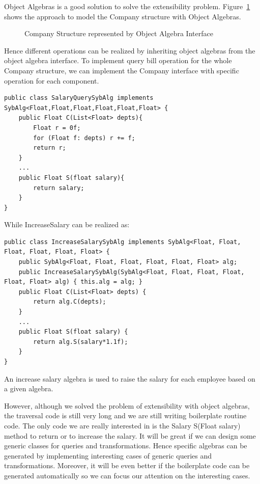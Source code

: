 Object Algebras is a good solution to solve the extensibility
problem.  
Figure~\ref{syb_tree} shows the approach to model the Company
structure with Object Algebras.

\begin{figure}[tb]
\vspace{-.1in}
\caption{Company Structure represented by Object Algebra Interface}
\label{syb_tree}
\end{figure}

Hence different operations can be realized by inheriting object
algebras from the object algebra interface. To implement query bill
operation for the whole Company structure, we can implement the
Company interface with specific operation for each component.

\begin{lstlisting}[numbers=none] 
public class SalaryQuerySybAlg implements SybAlg<Float,Float,Float,Float,Float,Float> {
	public Float C(List<Float> depts){
		Float r = 0f;
		for (Float f: depts) r += f;
		return r;
	}
	...
	public Float S(float salary){
		return salary;
	}
}
\end{lstlisting}

While IncreaseSalary can be realized as: 

\begin{lstlisting}[numbers=none]
public class IncreaseSalarySybAlg implements SybAlg<Float, Float, Float, Float, Float, Float> {
	public SybAlg<Float, Float, Float, Float, Float, Float> alg;
	public IncreaseSalarySybAlg(SybAlg<Float, Float, Float, Float, Float, Float> alg) { this.alg = alg; }
	public Float C(List<Float> depts) {
		return alg.C(depts);
	}
	...
	public Float S(float salary) {
		return alg.S(salary*1.1f);
	}
}
\end{lstlisting}

An increase salary algebra is used to raise the salary for each employee based on a given algebra. 

However, although we solved the problem of extensibility with object
algebras, the traversal code is still very long and we are still
writing boilerplate routine code. The only code we are really interested in is the
Salary S(Float salary) method to return or to increase the salary. It
will be great if we can design some generic classes for queries and
transformations. Hence specific algebras can be generated by
implementing interesting cases of generic queries and
transformations. Moreover, it will be even better if the boilerplate
code can be generated automatically so we can focus our attention on
the interesting cases.

